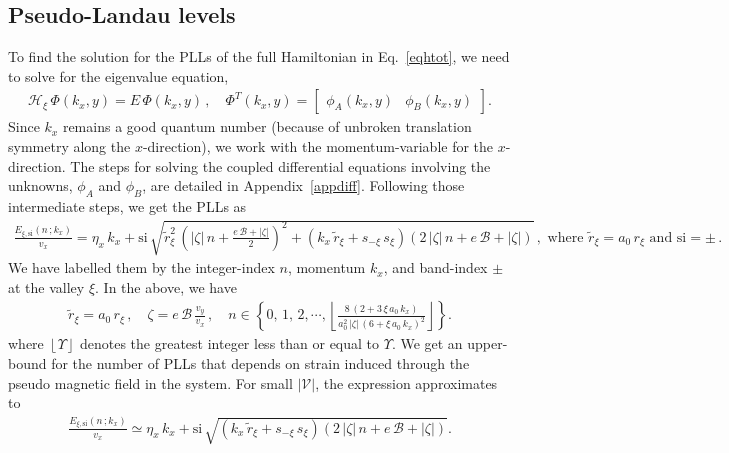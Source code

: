 \documentclass[aps,prb, onecolumn,nofootinbib,citeautoscript,10pt]{revtex4-2}
\begin{document}
\subsection{Pseudo-Landau levels}
\label{secll}


To find the solution for the PLLs of the full Hamiltonian in Eq.~\eqref{eqhtot}, we need to solve for the eigenvalue equation,
\begin{align}
\mathcal{H}_{\xi} \,\Phi (k_x, y) = E \,\Phi (k_x, y)\,,\quad
\Phi^T (k_x, y) = \begin{bmatrix}
\phi_A (k_x, y) & \phi_B(k_x, y) 
\end{bmatrix} .
\end{align}
Since $k_x$ remains a good quantum number (because of unbroken translation symmetry along the $x$-direction), we work with the momentum-variable for the $x$-direction. The steps for solving the coupled differential equations involving the unknowns, $\phi_A$ and $\phi_B$, are detailed in Appendix~\ref{appdiff}.
Following those intermediate steps, we get the PLLs as
\begin{align}
\frac{E_{\xi, \text{si}}(n\, ; k_x) } {v_x} =  
\eta_x \,   k_x + \text{si} \, 
\sqrt{\tilde r_\xi^2 \, \left( |\zeta | \, n
+ \frac{e \, \mathcal B+|\zeta|}{2} \right)^2
+ \left (k_x \, \tilde r_\xi + s_{-\xi} \, s_\xi \right )
\left (2 \, |\zeta |\, n + e \, \mathcal B+|\zeta| \right )}  \,,
\text{ where } \tilde{r}_\xi = a_0 \, r_\xi \text{ and } \text{si} = \pm \,.
\end{align}
We have labelled them by the integer-index $n$, momentum $k_x$, and band-index $\pm$ at the valley $\xi$. 
In the above, we have
\begin{align}
\tilde{r}_\xi = a_0 \, r_\xi \,, \quad \zeta =  e \, {\mathcal B} \, \frac{v_y}{v_x} \,, \quad
n \in \left\{ 0, \,1, \, 2,\cdots, 
\left\lfloor\frac{8 \,(2  + 3 \, \xi \,a_0\, k_x)}   { a_0^2\,|\zeta| \,(6 +\xi \,a_0\,  k_x)^2} \right\rfloor
\right\}.
\end{align} 
where $\left \lfloor  \Upsilon \right \rfloor$ denotes the greatest integer less than or equal to $\Upsilon$.
We get an upper-bound for the number of PLLs that depends on strain induced through the pseudo magnetic field in the system. For small $ |\mathcal V| $, the expression approximates to
\begin{align}
\frac{E_{\xi, \text{si}}(n\, ; k_x) } {v_x} \simeq    \eta_x \,   k_x 
+ \text{si}\, \sqrt{\left (k_x \, \tilde r_\xi + s_{-\xi} \, s_\xi \right )
\left (2 \, |\zeta |\, n + e \, \mathcal B+|\zeta| \right )} .
\end{align}
\end{document}
